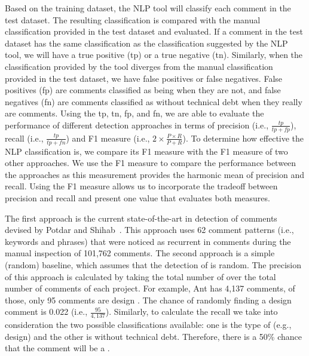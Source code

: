 Based on the training dataset, the NLP tool will classify each comment in the test dataset. The resulting classification is compared with the manual classification provided in the test dataset and evaluated. If a comment in the test dataset has the same classification as the classification suggested by the NLP tool, we will have a true positive (tp) or a true negative (tn).  Similarly, when the classification provided by the tool diverges from the manual classification provided in the test dataset, we have false positives or false negatives. False positives (fp) are comments classified as being \SATD when they are not, and false negatives (fn) are comments classified as without technical debt when they really are \SATD comments. Using the tp, tn, fp, and fn, we are able to evaluate the performance of different detection approaches in terms of precision (i.e., $\frac{tp}{tp + fp}$), recall (i.e., $\frac{tp}{tp + fn}$) and F1 measure (i.e., $2 \times \frac{P \times R}{P + R}$). To determine how effective the NLP classification is, we compare its F1 measure with the F1 measure of two other approaches. We use the F1 measure to compare the performance between the approaches as this measurement provides the harmonic mean of precision and recall. Using the F1 measure allows us to incorporate the tradeoff between precision and recall and present one value that evaluates both measures.

The first approach is the current state-of-the-art in detection of \SATD comments devised by Potdar and Shihab~\cite{Potdar2014ICSME}. This approach uses 62 comment patterns (i.e., keywords and phrases) that were noticed as recurrent in \SATD comments during the manual inspection of 101,762 comments. The second approach is a simple (random) baseline, which assumes that the detection of \SATD is random. The precision of this approach is calculated by taking the total number of \SATD over the total number of comments of each project. For example, Ant has 4,137 comments, of those, only 95 comments are design \SATD. The chance of randomly finding a design \SATD comment is 0.022 (i.e., $\frac{95}{4,137}$). Similarly, to calculate the recall we take into consideration the two possible classifications available: one is the type of \SATD (e.g., design) and the other is without technical debt. Therefore, there is a 50\% chance that the comment will be a \SATD. 

